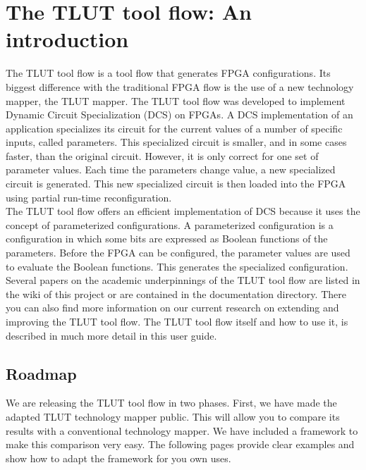 \documentclass[a4paper,oneside]{memoir}
\begin{document}
\let\clearforchapter\par %
\chapter{The TLUT tool flow: An introduction}

The TLUT tool flow is a tool flow that generates FPGA configurations. Its biggest difference with the traditional FPGA flow is the use of a new technology mapper, the TLUT mapper. The TLUT tool flow was developed to implement Dynamic Circuit Specialization (DCS) on FPGAs. A DCS implementation of an application specializes its circuit for the current values of a number of specific inputs, called parameters. This specialized circuit is smaller, and in some cases faster, than the original circuit. However, it is only correct for one set of parameter values. Each time the parameters change value, a new specialized circuit is generated. This new specialized circuit is then loaded into the FPGA using partial run-time reconfiguration.\\

The TLUT tool flow offers an efficient implementation of DCS because it uses the concept of parameterized configurations. A parameterized configuration is a configuration in which some bits are expressed as Boolean functions of the parameters. Before the FPGA can be configured, the parameter values are used to evaluate the Boolean functions. This generates the specialized configuration. Several papers on the academic underpinnings of the TLUT tool flow are listed in the wiki of this project or are contained in the documentation directory. There you can also find more information on our current research on extending and improving the TLUT tool flow. The TLUT tool flow itself and how to use it, is described in much more detail in this user guide.

\section{Roadmap}

We are releasing the TLUT tool flow in two phases. First, we have made the adapted TLUT technology mapper public. This will allow you to compare its results with a conventional technology mapper. We have included a framework to make this comparison very easy. The following pages provide clear examples and show how to adapt the framework for you own uses.\\
\end{document}
